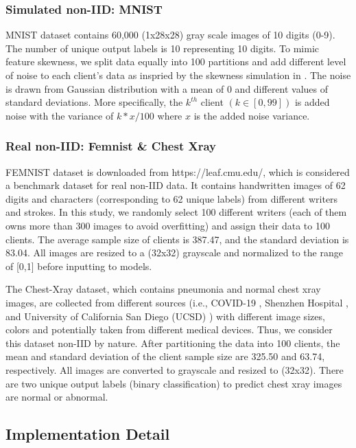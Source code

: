 \documentclass[mathfont=newtx]{uai2023} %
\newcommand\parties{100}
\begin{document}
\subsubsection{Simulated non-IID: MNIST}
MNIST dataset \cite{deng2012mnist} contains 60,000 (1x28x28) gray scale images of 10 digits (0-9). The number of unique output labels is 10 representing 10 digits. To mimic feature skewness, we split data equally into \parties{} partitions and add different level of noise to each client's data as inspried by the skewness simulation in \cite{abs-2102-02079}. The noise is drawn from Gaussian distribution with a mean of 0 and different values of standard deviations. More specifically, the $k^{th}$ client $(k \in [0,99])$ is added noise with the variance of $k*x/100$ where $x$ is the added noise variance.  

\subsubsection{Real non-IID: Femnist \& Chest Xray}
FEMNIST dataset is downloaded from https://leaf.cmu.edu/, which is considered a benchmark dataset for real non-IID data. It contains handwritten images of 62 digits and characters (corresponding to 62 unique labels) from different writers and strokes. In this study, we randomly select \parties{} different writers (each of them owns more than 300 images to avoid overfitting) and assign their data to \parties{} clients. The average sample size of clients is 387.47, and the standard deviation is 83.04. All images are resized to a (32x32) grayscale and normalized to the range of [0,1] before inputting to models.

The Chest-Xray dataset, which contains pneumonia and normal chest xray images, are collected from different sources (i.e., COVID-19 \cite{covid19}, Shenzhen Hospital \cite{Shenzhen}, and University of California San Diego (UCSD) \cite{Kermany2018LabeledOC}) with different image sizes, colors and potentially taken from different medical devices. Thus, we consider this dataset non-IID by nature. After partitioning the data into \parties{} clients, the mean and standard deviation of the client sample size are 325.50 and 63.74, respectively. All images are converted to grayscale and resized to (32x32). There are two unique output labels (binary classification) to predict chest xray images are normal or abnormal.

\subsection{Implementation Detail}
\end{document}
